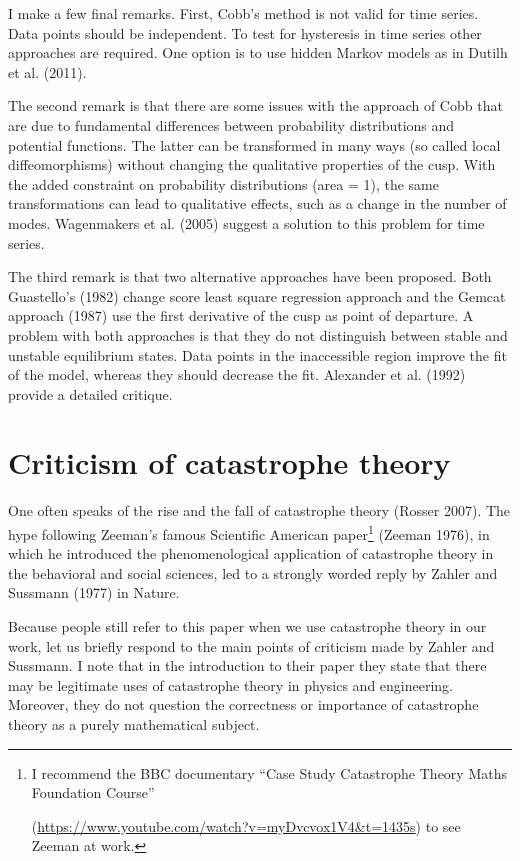 \documentclass[
  a4paper,
  DIV=11,
  numbers=noendperiod]{scrreprt}
\begin{document}
I make a few final remarks. First, Cobb's method is not valid for time
series. Data points should be independent. To test for hysteresis in
time series other approaches are required. One option is to use hidden
Markov models as in Dutilh et al. (2011).

The second remark is that there are some issues with the approach of
Cobb that are due to fundamental differences between probability
distributions and potential functions. The latter can be transformed in
many ways (so called local diffeomorphisms) without changing the
qualitative properties of the cusp. With the added constraint on
probability distributions (area = 1), the same transformations can lead
to qualitative effects, such as a change in the number of modes.
Wagenmakers et al. (2005) suggest a solution to this problem for time
series.

The third remark is that two alternative approaches have been proposed.
Both Guastello's (1982) change score least square regression approach
and the Gemcat approach (1987) use the first derivative of the cusp as
point of departure. A problem with both approaches is that they do not
distinguish between stable and unstable equilibrium states. Data points
in the inaccessible region improve the fit of the model, whereas they
should decrease the fit. Alexander et al. (1992) provide a detailed
critique.

\hypertarget{sec-Criticism-of-catastrophe-theory}{%
\section{Criticism of catastrophe
theory}\label{sec-Criticism-of-catastrophe-theory}}

One often speaks of the rise and the fall of catastrophe theory (Rosser
2007). The hype following Zeeman's famous Scientific American
paper\footnote{I recommend the BBC documentary ``Case Study Catastrophe
  Theory Maths Foundation Course''

  (\url{https://www.youtube.com/watch?v=myDvcvox1V4\&t=1435s}) to see
  Zeeman at work.} (Zeeman 1976), in which he introduced the
phenomenological application of catastrophe theory in the behavioral and
social sciences, led to a strongly worded reply by Zahler and Sussmann
(1977) in Nature.

Because people still refer to this paper when we use catastrophe theory
in our work, let us briefly respond to the main points of criticism made
by Zahler and Sussmann. I note that in the introduction to their paper
they state that there may be legitimate uses of catastrophe theory in
physics and engineering. Moreover, they do not question the correctness
or importance of catastrophe theory as a purely mathematical subject.
\end{document}
